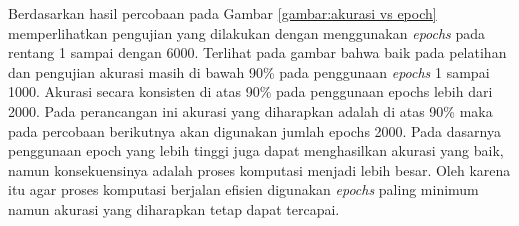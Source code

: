 Berdasarkan hasil percobaan pada Gambar \ref{gambar:akurasi vs epoch} memperlihatkan pengujian yang dilakukan dengan menggunakan \textit{epochs} pada rentang 1 sampai dengan 6000. Terlihat pada gambar bahwa baik pada pelatihan dan pengujian akurasi masih di bawah 90\% pada penggunaan \textit{epochs} 1 sampai 1000. Akurasi secara konsisten di atas 90\% pada penggunaan epochs lebih dari 2000.
Pada perancangan ini akurasi yang diharapkan adalah di atas 90\% maka pada percobaan berikutnya akan digunakan jumlah epochs 2000. Pada dasarnya penggunaan epoch yang lebih tinggi juga dapat menghasilkan akurasi yang baik, namun konsekuensinya adalah proses komputasi menjadi lebih besar. Oleh karena itu agar proses komputasi berjalan efisien digunakan \textit{epochs} paling minimum namun akurasi yang diharapkan tetap dapat tercapai.
 


